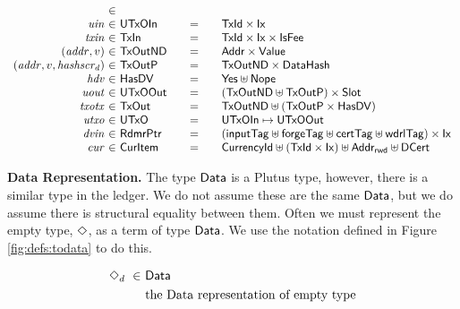 \begin{figure*}[htb]
\begin{equation*}
\begin{array}{r@{~\in~}l@{\qquad=\qquad}lr}
      \\
      \var{uin}
      & \UTxOIn
      & \TxId \times \Ix
      \\
      \var{txin}
      & \TxIn
      & \TxId \times \Ix \times \IsFee
      \\
      (\var{addr}, v)
      & \type{TxOutND}
      & \Addr \times \Value
      \\
      (\var{addr}, v, \var{hashscr_d})
      & \type{TxOutP}
      & \type{TxOutND} \times \DataHash
      \\
      \var{hdv}
      & \HasDV
      & \Yes \uniondistinct \Nope
      \\
      \var{uout}
      & \UTxOOut
      & (\TxOutND \uniondistinct \TxOutP) \times \Slot
      \\
      \var{txotx}
      & \TxOut
      & \TxOutND \uniondistinct (\TxOutP \times \HasDV)
      \\
      \var{utxo}
      & \UTxO
      & \UTxOIn \mapsto \UTxOOut
      \\
      \var{dvin}
      & \RdmrPtr
      & (\mathsf{inputTag} \uniondistinct \mathsf{forgeTag} \uniondistinct
      \mathsf{certTag} \uniondistinct \mathsf{wdrlTag}) \times \Ix
      \\
      \var{cur}
      & \CurItem
      & \CurrencyId \uniondistinct (\TxId \times \Ix) \uniondistinct \AddrRWD \uniondistinct \DCert
    \end{array}
  \end{equation*}
  \caption{Definitions used in the UTxO transition system}
  \label{fig:defs:utxo-shelley-1}
\end{figure*}


\textbf{Data Representation.}
The type $\mathsf{Data}$ is a Plutus type, however, there is a similar type in the
ledger. We do not assume these are the same $\mathsf{Data}$, but we do assume there
is structural equality between them. Often we must represent the empty type,
$\Diamond$, as a term of type $\mathsf{Data}$. We use the notation defined in
Figure \ref{fig:defs:todata} to do this.

\begin{figure*}[htb]
  \begin{align*}
    \Diamond_d ~\in~& \mathsf{Data} \\
    & \text{the Data representation of empty type} \\
  \end{align*}
  \caption{Empty Data Representation}
  \label{fig:defs:todata}
\end{figure*}

